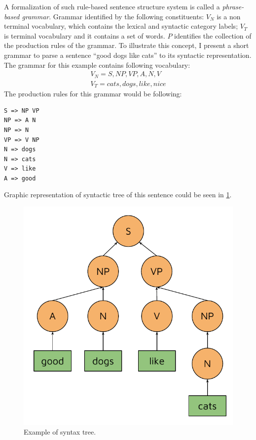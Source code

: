 A formalization of such rule-based sentence structure system is called a \emph{phrase-based grammar}. Grammar identified by the following constituents:
$V_N$ is a non terminal vocabulary, which contains the lexical and syntactic category labels;
$V_T$ is terminal vocabulary and it contains a set of words.
$P$ identifies the collection of the production rules of the grammar.
To illustrate this concept, I present a short grammar to parse a sentence "`good dogs like cats"' to its syntactic representation. The grammar for this example contains following vocabulary:
\begin{equation}
\begin{split}
V_N = {S, NP, VP, A, N, V}\\
V_T = {cats, dogs, like, nice}
\end{split}
\end{equation}
The production rules for this grammar would be following:
\begin{verbatim}
S => NP VP
NP => A N
NP => N
VP => V NP
N => dogs
N => cats
V => like
A => good
\end{verbatim}
Graphic representation of syntactic tree  of this sentence could be seen in \ref{fig:syntax_tree}.

\begin{figure}
\centering
\includegraphics{Figures/syntaxtree}
\decoRule
\caption[Syntax tree]{Example of syntax tree.}
\label{fig:syntax_tree}
\end{figure}

